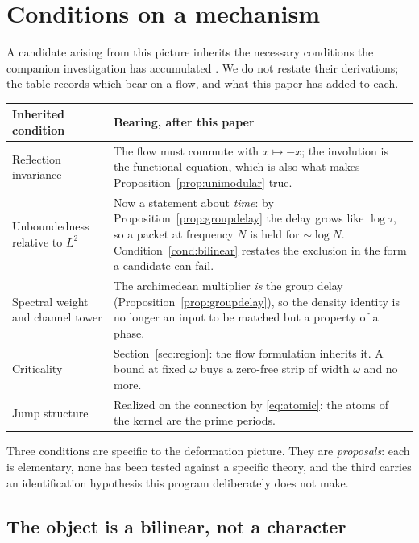 \section{Conditions on a mechanism}\label{sec:conditions}

A candidate arising from this picture inherits the necessary conditions the
companion investigation has accumulated \cite{Selection}. We do not restate their
derivations; the table records which bear on a flow, and what this paper has
added to each.

\begin{center}
\begin{tabular}{@{}p{}p{}@{}}
\toprule
Inherited condition & Bearing, after this paper\\
\midrule
Reflection invariance & The flow must commute with $x\mapsto-x$; the involution is
the functional equation, which is also what makes
Proposition~\ref{prop:unimodular} true.\\
Unboundedness relative to $L^2$ & Now a statement about \emph{time}: by
Proposition~\ref{prop:groupdelay} the delay grows like $\log\tau$, so a packet at
frequency $N$ is held for $\sim\log N$. Condition~\ref{cond:bilinear} restates the
exclusion in the form a candidate can fail.\\
Spectral weight and channel tower & The archimedean multiplier \emph{is} the group
delay (Proposition~\ref{prop:groupdelay}), so the density identity is no longer an
input to be matched but a property of a phase.\\
Criticality & Section~\ref{sec:region}: the flow formulation inherits it. A bound
at fixed $\omega$ buys a zero-free strip of width $\omega$ and no more.\\
Jump structure & Realized on the connection by \eqref{eq:atomic}: the atoms of the
kernel are the prime periods.\\
\bottomrule
\end{tabular}
\end{center}

Three conditions are specific to the deformation picture. They are
\emph{proposals}: each is elementary, none has been tested against a specific
theory, and the third carries an identification hypothesis this program
deliberately does not make.

\subsection{The object is a bilinear, not a character}

